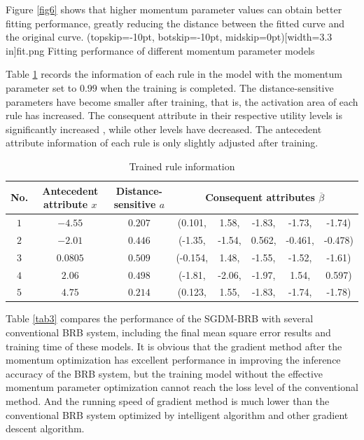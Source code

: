 \documentclass{ieeeaccess}
\begin{document}
Figure \ref{fig6} shows that higher momentum parameter values can obtain better fitting performance,
greatly reducing the distance between the fitted curve and the original curve.
\Figure[!t](topskip=-10pt, botskip=-10pt, midskip=0pt)[width=3.3 in]{fit.png}
{Fitting performance of different momentum parameter models\label{fig6}}

Table \ref{tab2} records the information of each rule in the model with the momentum parameter set to $0.99$ when the training is completed.
The distance-sensitive parameters have become smaller after training, that is, the activation area of each rule has increased.
The consequent attribute in their respective utility levels is significantly increased , while other levels have decreased.
The antecedent attribute information of each rule is only slightly adjusted after training.

\begin{table}
    \caption{Trained rule information}
    \centering
    \normalsize
    \label{tab2}
    \begin{tabular}{cccccccc}
        \hline
        No. & Antecedent attribute $x$ & Distance-sensitive $a$ & \multicolumn{5}{c}{Consequent attributes $\overline{\beta}$}                                       \\
        \hline
        $1$ & $-4.55$                  & $0.207$                & (0.101,                                                      & 1.58,  & -1.83, & -1.73,  & -1.74)  \\
        $2$ & $-2.01$                  & $0.446$                & (-1.35,                                                      & -1.54, & 0.562, & -0.461, & -0.478) \\
        $3$ & $0.0805$                 & $0.509$                & (-0.154,                                                     & 1.48,  & -1.55, & -1.52,  & -1.61)  \\
        $4$ & $2.06$                   & $0.498$                & (-1.81,                                                      & -2.06, & -1.97, & 1.54,   & 0.597)  \\
        $5$ & $4.75$                   & $0.214$                & (0.123,                                                      & 1.55,  & -1.83, & -1.74,  & -1.78)  \\
        \hline
    \end{tabular}
\end{table}

Table \ref{tab3} compares the performance of the SGDM-BRB with several conventional BRB system,
including the final mean square error results and training time of these models.
It is obvious that the gradient method after the momentum optimization has excellent performance in improving the inference accuracy of the BRB system,
but the training model without the effective momentum parameter optimization cannot reach the loss level of the conventional method.
And the running speed of gradient method is much lower than the conventional BRB system optimized by intelligent algorithm and other gradient descent algorithm.
\end{document}
